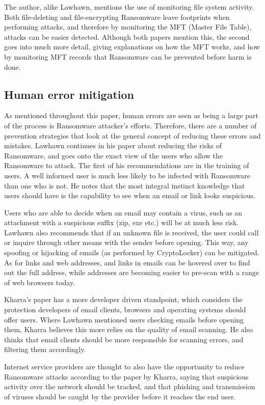 \documentclass[journal,comsoc]{IEEEtran}
\begin{document}
The author, alike Lawhawn, mentions the use of monitoring file system activity. Both file-deleting and file-encrypting Ransomware leave footprints when performing attacks, and therefore by monitoring the MFT (Master File Table), attacks can be easier detected. Although both papers mention this, the second goes into much more detail, giving explanations on how the MFT works, and how by monitoring MFT records that Ransomware can be prevented before harm is done. 

\subsection{Human error mitigation}
As mentioned throughout this paper, human errors are seen as being a large part of the process is Ransomware attacker's efforts. Therefore, there are a number of prevention strategies that look at the general concept of reducing these errors and mistakes. Lawhawn continues in his paper about reducing the risks of Ransomware, and goes onto the exact view of the users who allow the Ransomware to attack. The first of his recommendations are in the training of users. A well informed user is much less likely to be infected with Ransomware than one who is not. He notes that the most integral instinct knowledge that users should have is the capability to see when an email or link looks suspicious.\par
Users who are able to decide when an email may contain a virus, such as an attachment with a suspicious suffix (zip, exe etc.) will be at much less risk. Lawhawn also recommends that if an unknown file is received, the user could call or inquire through other means with the sender before opening. This way, any spoofing or hijacking of emails (as performed by CryptoLocker) can be mitigated. As for links and web addresses, and links in emails can be hovered over to find out the full address, while addresses are becoming easier to pre-scan with a range of web browsers today. \par
Kharra's paper has a more developer driven standpoint, which considers the protection developers of email clients, browsers and operating systems should offer users.  Where Lawhawn mentioned users checking emails before opening them, Kharra believes this more relies on the quality of email scanning. He also thinks that email clients should be more responsible for scanning errors, and filtering them accordingly. \par
Internet service providers are thought to also have the opportunity to reduce Ransomware attacks according to the paper by Kharra, saying that suspicious activity over the network should be tracked, and that phishing and transmission of viruses should be caught by the provider before it reaches the end user. \par
\end{document}

